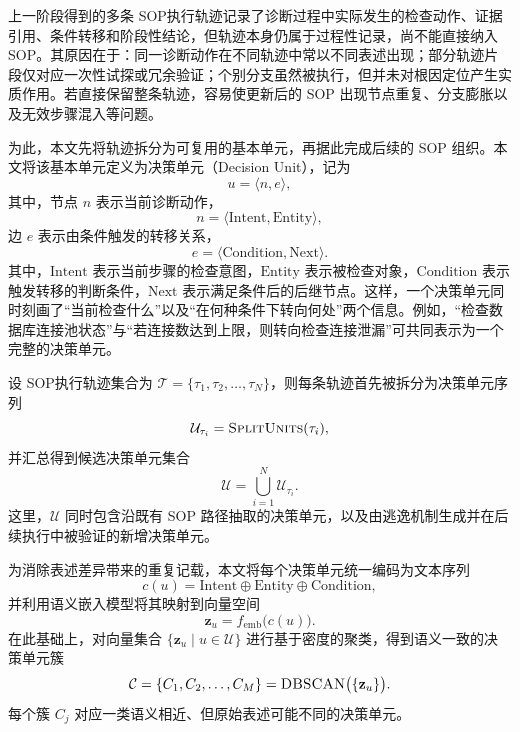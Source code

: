 上一阶段得到的多条 SOP执行轨迹记录了诊断过程中实际发生的检查动作、证据引用、条件转移和阶段性结论，但轨迹本身仍属于过程性记录，尚不能直接纳入 SOP。其原因在于：同一诊断动作在不同轨迹中常以不同表述出现；部分轨迹片段仅对应一次性试探或冗余验证；个别分支虽然被执行，但并未对根因定位产生实质作用。若直接保留整条轨迹，容易使更新后的 SOP 出现节点重复、分支膨胀以及无效步骤混入等问题。

为此，本文先将轨迹拆分为可复用的基本单元，再据此完成后续的 SOP 组织。本文将该基本单元定义为决策单元（Decision Unit），记为
\begin{equation}
u=\langle n,e\rangle,
\end{equation}
其中，节点 $n$ 表示当前诊断动作，
\begin{equation}
n=\langle \text{Intent},\text{Entity}\rangle,
\end{equation}
边 $e$ 表示由条件触发的转移关系，
\begin{equation}
e=\langle \text{Condition},\text{Next}\rangle.
\end{equation}
其中，$\text{Intent}$ 表示当前步骤的检查意图，$\text{Entity}$ 表示被检查对象，$\text{Condition}$ 表示触发转移的判断条件，$\text{Next}$ 表示满足条件后的后继节点。这样，一个决策单元同时刻画了“当前检查什么”以及“在何种条件下转向何处”两个信息。例如，“检查数据库连接池状态”与“若连接数达到上限，则转向检查连接泄漏”可共同表示为一个完整的决策单元。

设 SOP执行轨迹集合为 $\mathcal{T}=\{\tau_1,\tau_2,\ldots,\tau_N\}$，则每条轨迹首先被拆分为决策单元序列
\begin{equation}
\mathcal{U}_{\tau_i}=\textsc{SplitUnits}(\tau_i),
\end{equation}
并汇总得到候选决策单元集合
\begin{equation}
\mathcal{U}=\bigcup_{i=1}^{N}\mathcal{U}_{\tau_i}.
\end{equation}
这里，$\mathcal{U}$ 同时包含沿既有 SOP 路径抽取的决策单元，以及由逃逸机制生成并在后续执行中被验证的新增决策单元。

为消除表述差异带来的重复记载，本文将每个决策单元统一编码为文本序列
\begin{equation}
c(u)=\text{Intent}\oplus \text{Entity}\oplus \text{Condition},
\end{equation}
并利用语义嵌入模型将其映射到向量空间
\begin{equation}
\mathbf{z}_{u}=f_{\mathrm{emb}}\big(c(u)\big).
\end{equation}
在此基础上，对向量集合 $\{\mathbf{z}_{u}\mid u\in\mathcal{U}\}$ 进行基于密度的聚类，得到语义一致的决策单元簇
\begin{equation}
\mathcal{C}=\{C_{1},C_{2},\ldots,C_{M}\}=\textsc{DBSCAN}\big(\{\mathbf{z}_{u}\}\big).
\end{equation}
每个簇 $C_j$ 对应一类语义相近、但原始表述可能不同的决策单元。

